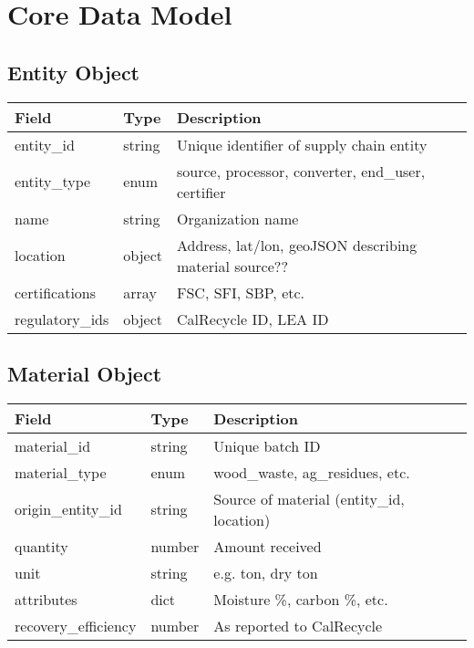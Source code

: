 \documentclass{article}
\begin{document}
\section{Core Data Model}

\subsection*{Entity Object}
\begin{longtable}{|p{3cm}|p{3cm}|p{8cm}|}
\hline
\textbf{Field} & \textbf{Type} & \textbf{Description} \\
\hline
entity\_id & string & Unique identifier of supply chain entity \\
entity\_type & enum & source, processor, converter, end\_user, certifier \\
name & string & Organization name \\
location & object & Address, lat/lon, geoJSON describing material source?? \\
certifications & array & FSC, SFI, SBP, etc. \\
regulatory\_ids & object & CalRecycle ID, LEA ID \\
\hline
\end{longtable}

\subsection*{Material Object}
\begin{longtable}{|p{3cm}|p{3cm}|p{8cm}|}
\hline
\textbf{Field} & \textbf{Type} & \textbf{Description} \\
\hline
material\_id & string & Unique batch ID \\
material\_type & enum & wood\_waste, ag\_residues, etc. \\
origin\_entity\_id & string & Source of material (entity\_id, location) \\
quantity & number & Amount received \\
unit & string & e.g. ton, dry ton \\
attributes & dict & Moisture \%, carbon \%, etc. \\
recovery\_efficiency & number & As reported to CalRecycle \\
\hline
\end{longtable}
\end{document}
